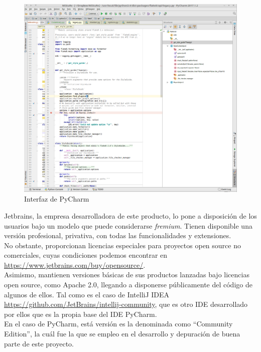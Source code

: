 \begin{figure}[H]
   \centering
   \includegraphics[width=16cm]{img/pycharm}
   \caption{Interfaz de PyCharm }
   \label{figura:pycharm}
\end{figure}



Jetbrains, la empresa desarrolladora de este producto, lo pone a disposición de los usuarios bajo un modelo que puede considerarse \textit{fremium}. Tienen disponible una versión profesional, privativa, con todas las funcionalidades y extensiones.\\


No obstante, proporcionan licencias especiales para proyectos open source no comerciales, cuyas condiciones podemos encontrar en \url{https://www.jetbrains.com/buy/opensource/}.\\


Asimismo, mantienen versiones básicas de sus productos lanzadas bajo licencias open source, como Apache 2.0, llegando a disponerse públicamente del código de algunos de ellos. Tal como es el caso de IntelliJ IDEA \url{https://github.com/JetBrains/intellij-community}, que es otro IDE desarrollado por ellos que es la propia base del IDE PyCharm.\\


En el caso de PyCharm, está versión es la denominada como ``Community Edition'', la cuál fue la que se empleo en el desarrollo y depuración de buena parte de este proyecto.\\


